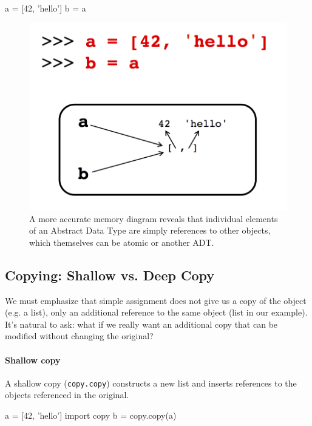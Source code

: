 \documentclass[12pt,letterpaper,twoside]{article}
\begin{document}
\vspace{-3ex}
\begin{python}
a = [42, 'hello']
b = a
\end{python}
\vspace{-2ex}
\begin{figure}[h]
\centering
\includegraphics[scale=0.35]{fig/list-ref.png}
\caption{\small A more accurate memory diagram reveals that individual elements of an Abstract Data Type are simply
references to other objects, which themselves can be atomic or another ADT.}
\end{figure}

\vspace{-3ex}
\subsection{Copying: Shallow vs. Deep Copy}
We must emphasize that simple assignment does not give us a copy of the object (e.g. a list), only an
additional reference to the same object (list in our example). It's natural to ask: 
what if we really want an additional copy that can be modified without
changing the original?

\paragraph{Shallow copy}
A shallow copy (\texttt{copy.copy}) constructs a new list and inserts
references to the objects referenced in the original.

\begin{python}
a = [42, 'hello']
import copy
b = copy.copy(a)
\end{python}
\end{document}
